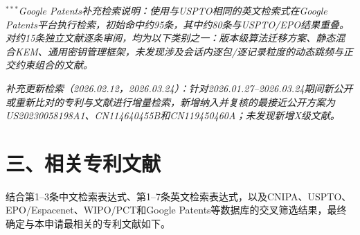 ﻿\documentclass[12pt,a4paper]{article}
\begin{document}
\noindent\textit{$^{***}$Google Patents补充检索说明：使用与USPTO相同的英文检索式在Google Patents平台执行检索，初始命中约95条，其中约80条与USPTO/EPO结果重叠。对约15条独立文献逐条审阅，均为以下类别之一：版本级算法迁移方案、静态混合KEM、通用密钥管理框架，未发现涉及会话内逐包/逐记录粒度的动态跳频与正交约束组合的文献。}

\noindent\textit{补充更新检索（2026.02.12，2026.03.24）：针对2026.01.27--2026.03.24期间新公开或重新比对的专利与文献进行增量检索，新增纳入并复核的最接近公开方案为US20230058198A1、CN114640455B和CN119450460A；未发现新增X级文献。}

\section*{三、相关专利文献}

\noindent 结合第1--3条中文检索表达式、第1--7条英文检索表达式，以及CNIPA、USPTO、EPO/Espacenet、WIPO/PCT和Google Patents等数据库的交叉筛选结果，最终确定与本申请最相关的专利文献如下。
\end{document}
